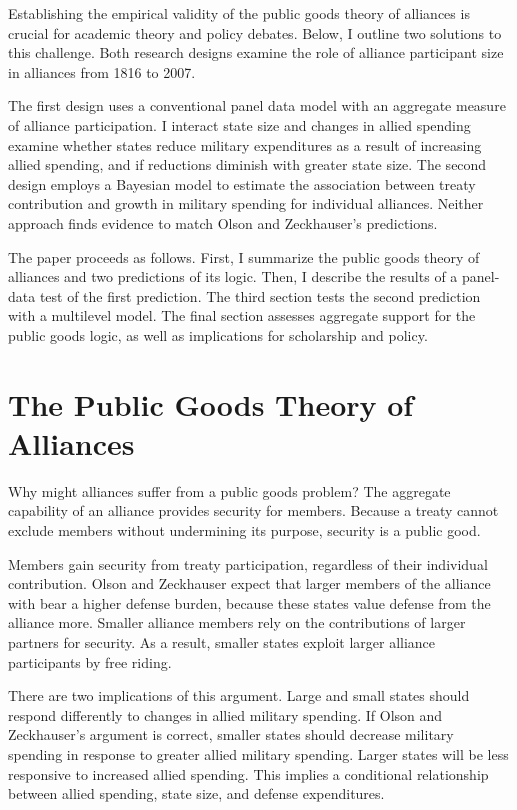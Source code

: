 \documentclass[12pt]{article}
\begin{document}
Establishing the empirical validity of the public goods theory of alliances is crucial for academic theory and policy debates. 
Below, I outline two solutions to this challenge. 
Both research designs examine the role of alliance participant size in alliances from 1816 to 2007. 


The first design uses a conventional panel data model with an aggregate measure of alliance participation. 
I interact state size and changes in allied spending examine whether states reduce military expenditures as a result of increasing allied spending, and if reductions diminish with greater state size. 
The second design employs a Bayesian model to estimate the association between treaty contribution and growth in military spending for individual alliances. 
Neither approach finds evidence to match Olson and Zeckhauser's predictions. 


The paper proceeds as follows.
First, I summarize the public goods theory of alliances and two predictions of its logic.
Then, I describe the results of a panel-data test of the first prediction.
The third section tests the second prediction with a multilevel model. 
The final section assesses aggregate support for the public goods logic, as well as implications for scholarship and policy. 


\section{The Public Goods Theory of Alliances}


Why might alliances suffer from a public goods problem? 
The aggregate capability of an alliance provides security for members. 
Because a treaty cannot exclude members without undermining its purpose, security is a public good. 


Members gain security from treaty participation, regardless of their individual contribution. 
Olson and Zeckhauser expect that larger members of the alliance with bear a higher defense burden, because these states value defense from the alliance more. 
Smaller alliance members rely on the contributions of larger partners for security.
As a result, smaller states exploit larger alliance participants by free riding. 


There are two implications of this argument. 
Large and small states should respond differently to changes in allied military spending. 
If Olson and Zeckhauser's argument is correct, smaller states should decrease military spending in response to greater allied military spending. 
Larger states will be less responsive to increased allied spending. 
This implies a conditional relationship between allied spending, state size, and defense expenditures. 
\end{document}
